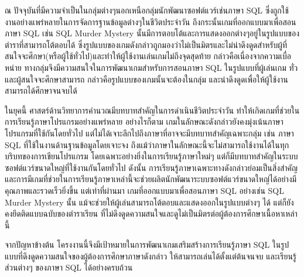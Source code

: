 \maketitle
\makesignature

\ifproject
\begin{abstractTH}
ณ ปัจจุบันที่มีความจำเป็นในกลุ่มต่างๆนอกเหนือกลุ่มนักพัฒนาซอฟต์แวร์เช่นภาษา SQL ซึ่งถูกใช้งานอย่างแพร่หลายในการจัดการฐานข้อมูลต่างๆในชีวิตประจำวัน ถึงกระนั้นเกมที่ออกแบบมาเพื่อสอนภาษา SQL เช่น SQL Murder Mystery นั้นมีการตอบโต้และการแสดงออกต่างๆอยู่ในรูปแบบของตำราที่สามารถโต้ตอบได้ ซึ่งรูปแบบของเกมดังกล่าวถูกมองว่าไม่เป็นมิตรและไม่น่าดึงดูดสำหรับผู้ที่สนใจจะศึกษา(หรือผู้ใช้ทั่วไป)และทำให้ผู้ใช้งานเล่นเกมไม่ถึงจุดสุดท้าย กล่าวคือเนื่องจากความเบื่อหน่าย ทางกลุ่มจึงมีความสนใจในการพัฒนาเกมสำหรับการสอนภาษา SQL ในรูปแบบที่ผู้เล่นเกม ทั่วและผู้สนใจจะศึกษาสามารถ กล่าวคือรูปแบบของเกมนั้นจะต้องในกลุ่ม และน่าดึงดูดเพื่อให้ผู้ใช้งานสามารถได้ศึกษาจนจบได้

\vfill
{
\color{Green4}

ในยุคนี้ ศาสตร์ด้านวิทยาการคำนวณมีบทบาทสำคัญในการดำเนินชีวิตประจำวัน ทำให้เกิดเกมที่ช่วยในการเรียนรู้ภาษาโปรแกรมอย่างแพร่หลาย
\enskip อย่างไรก็ตาม เกมในลักษณะดังกล่าวยังคงมุ่งเน้นภาษาโปรแกรมที่ใช้กันโดยทั่วไป แต่ไม่ได้เจาะลึกไปถึงภาษาที่อาจจะมีบทบาทสำคัญเฉพาะกลุ่ม เช่น ภาษา SQL ที่ใช้ในงานด้านฐานข้อมูลโดยเจาะจง
\enskip ถึงแม้ว่าภาษาในลักษณะนี้จะไม่สามารถใช้งานได้ในทุกบริบทของการเขียนโปรแกรม โดยเฉพาะอย่างยิ่งในการเรียนรู้ภาษาใหม่ๆ แต่ก็มีบทบาทสำคัญในระบบซอฟต์แวร์ขนาดใหญ่ที่ใช้งานกันโดยทั่วไป
ดังนั้น การเรียนรู้ภาษาเฉพาะทางดังกล่าวย่อมเป็นสิ่งสำคัญ และการมีเกมที่ช่วยในการเรียนรู้ภาษาเหล่านี้จะช่วยผลิตนักพัฒนาระบบซอฟต์แวร์ขนาดใหญ่ได้อย่างมีคุณภาพและรวดเร็วยิ่งขึ้น
\enskip แต่เท่าที่ผ่านมา เกมที่ออกแบบมาเพื่อสอนภาษา SQL อย่างเช่น SQL Murder Mystery นั้น แม้จะช่วยให้ผู้เล่นสามารถโต้ตอบและแสดงออกในรูปแบบต่างๆ ได้ แต่ก็ยังคงยึดติดแบบฉบับของตำราเรียน ที่ไม่ดึงดูดความสนใจและดูไม่เป็นมิตรต่อผู้ต้องการศึกษาเนื้อหาเหล่านี้

จากปัญหาข้างต้น โครงงานนี้จึงมีเป้าหมายในการพัฒนาเกมเสริมสร้างการเรียนรู้ภาษา SQL ในรูปแบบที่ดึงดูดความสนใจของผู้ต้องการศึกษาภาษาดังกล่าว ให้สามารถเล่นได้ตั้งแต่ต้นจนจบ และเรียนรู้ส่วนต่างๆ ของภาษา SQL ได้อย่างครบถ้วน
}
\end{abstractTH}

